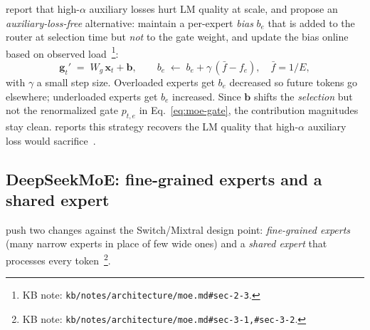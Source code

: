 \citet[\S 2]{deepseek-v3} report that high-$\alpha$ auxiliary losses
hurt LM quality at scale, and propose an
\emph{auxiliary-loss-free} alternative: maintain a per-expert
\emph{bias} $b_e$ that is added to the router  at selection
time but \emph{not} to the gate weight, and update the bias online
based on observed
load~\citep{deepseek-v3}\footnote{KB note:
\nolinkurl{kb/notes/architecture/moe.md#sec-2-3}. }:
\begin{equation}
  \mathbf{g}_t' \;=\; W_g\,\mathbf{x}_t + \mathbf{b},
  \qquad
  b_e \;\leftarrow\; b_e + \gamma\,(\bar{f} - f_e),
  \quad \bar{f} = 1/E,
  \label{eq:moe-aux-free}
\end{equation}
with $\gamma$ a small step size. Overloaded experts get $b_e$
decreased so future tokens go elsewhere; underloaded experts get
$b_e$ increased. Since $\mathbf{b}$ shifts the \emph{selection}
 but not the renormalized gate $p_{t,e}$ in
Eq.~\eqref{eq:moe-gate}, the contribution magnitudes stay
clean.  reports this strategy recovers the LM quality
that high-$\alpha$ auxiliary loss would
sacrifice~\citep[abstract]{deepseek-v3}.

\subsection{DeepSeekMoE: fine-grained experts and a shared expert}
\label{sec:ffn-fine-grained}

\citet{deepseekmoe2024} push two changes against the
Switch/Mixtral design point: \emph{fine-grained experts} (many narrow
experts in place of few wide ones) and a \emph{shared expert} that
processes every
token~\citep{deepseekmoe2024}\footnote{KB note:
\nolinkurl{kb/notes/architecture/moe.md#sec-3-1,#sec-3-2}. }.

